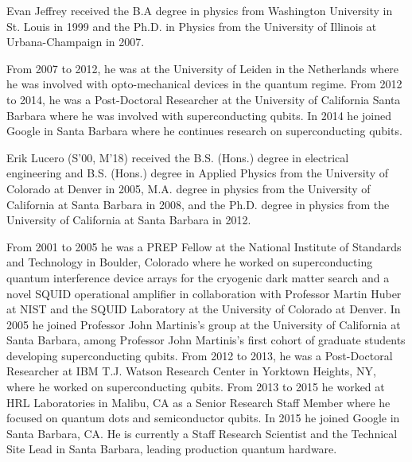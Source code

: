 \documentclass[journal]{IEEEtran}
\begin{document}
\begin{IEEEbiography}
{Evan Jeffrey}  received the B.A degree in physics from Washington University in St. Louis in 1999 and the Ph.D. in Physics from the University of Illinois at Urbana-Champaign in 2007.

From 2007 to 2012, he was at the University of Leiden in the Netherlands where he was involved with opto-mechanical devices in the quantum regime.  From 2012 to 2014, he was a Post-Doctoral Researcher at the University of California Santa Barbara where he was involved with superconducting qubits.  In 2014 he joined Google in Santa Barbara where he continues research on superconducting qubits.
\end{IEEEbiography}
\begin{IEEEbiography}{Erik Lucero}
(S’00, M’18) received the B.S. (Hons.) degree in electrical engineering and B.S. (Hons.) degree in Applied Physics from the University of Colorado at Denver in 2005, M.A. degree in physics from the University of California at Santa Barbara in 2008, and the Ph.D. degree in physics from the University of California at Santa Barbara in 2012.

From 2001 to 2005 he was a PREP Fellow at the National Institute of Standards and Technology in Boulder, Colorado where he worked on superconducting quantum interference device arrays for the cryogenic dark matter search and a novel SQUID operational amplifier in collaboration with Professor Martin Huber at NIST and the SQUID Laboratory at the University of Colorado at Denver. In 2005 he joined Professor John Martinis's group at the University of California at Santa Barbara, among Professor John Martinis’s first cohort of graduate students developing superconducting qubits. From 2012 to 2013, he was a Post-Doctoral Researcher at IBM T.J. Watson Research Center in Yorktown Heights, NY, where he worked on superconducting qubits. From 2013 to 2015 he worked at HRL Laboratories in Malibu, CA as a Senior Research Staff Member where he focused on quantum dots and semiconductor qubits. In 2015 he joined Google in Santa Barbara, CA. He is currently a Staff Research Scientist and the Technical Site Lead in Santa Barbara, leading production quantum hardware.
\end{IEEEbiography}
\end{document}
